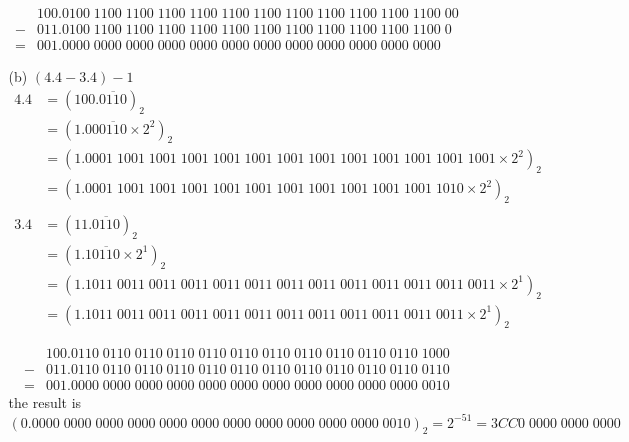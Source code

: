 \documentclass[UTF8]{ctexart}
\begin{document}
\begin{enumerate}
\begin{itemize}
\begin{align*}
 &100.0100\;1100\;1100\;1100\;1100\;1100\;1100\;1100\;1100\;1100\;1100\;1100\;00 \\
-&011.0100\;1100\;1100\;1100\;1100\;1100\;1100\;1100\;1100\;1100\;1100\;1100\;0 \\
\hline
=&001.0000\;0000\;0000\;0000\;0000\;0000\;0000\;0000\;0000\;0000\;0000\;0000
\end{align*}

\item[(b)] $(4.4 - 3.4) - 1$
\begin{align*}
4.4 &= (100.\overline{0110})_2 \\
&= (1.00\overline{0110} \times 2^2)_2 \\
&= (1.0001\;1001\;1001\;1001\;1001\;1001\;1001\;1001\;1001\;1001\;1001\;1001\;1001 \times 2^2)_2 \\
&= (1.0001\;1001\;1001\;1001\;1001\;1001\;1001\;1001\;1001\;1001\;1001\;1010 \times 2^2)_2 \\
\end{align*}
\begin{align*}
3.4 &= (11.\overline{0110})_2 \\
&= (1.1\overline{0110} \times 2^1)_2 \\
&= (1.1011\;0011\;0011\;0011\;0011\;0011\;0011\;0011\;0011\;0011\;0011\;0011\;0011 \times 2^1)_2 \\
&= (1.1011\;0011\;0011\;0011\;0011\;0011\;0011\;0011\;0011\;0011\;0011\;0011 \times 2^1)_2
\end{align*}

\begin{align*}
 &100.0110\;0110\;0110\;0110\;0110\;0110\;0110\;0110\;0110\;0110\;0110\;1000 \\
-&011.0110\;0110\;0110\;0110\;0110\;0110\;0110\;0110\;0110\;0110\;0110\;0110 \\
\hline
=&001.0000\;0000\;0000\;0000\;0000\;0000\;0000\;0000\;0000\;0000\;0000\;0010
\end{align*}
the result is $(0.0000\;0000\;0000\;0000\;0000\;0000\;0000\;0000\;0000\;0000\;0000\;0010)_2 = 2^{-51} = 3CC0\;0000\;0000\;0000$


\end{itemize}
\end{enumerate}
\end{document}
